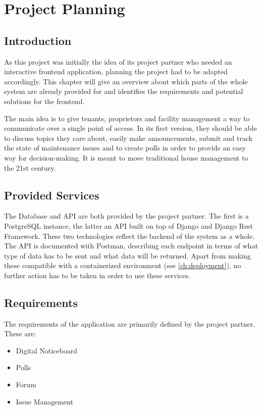 \chapter[Project Planning]{Project Planning}

\section{Introduction}
As this project was initially the idea of its project partner who needed an interactive frontend application, planning the project had to be adapted accordingly. This chapter will give an overview about which parts of the whole system are already provided for and identifies the requirements and potential solutions for the frontend.

The main idea is to give tenants, proprietors and facility management a way to communicate over a single point of access. In its first version, they should be able to discuss topics they care about, easily make announcements, submit and track the state of maintenance issues and to create polls in order to provide an easy way for decision-making. It is meant to move traditional house management to the 21st century.

\section{Provided Services}
The Database and API are both provided by the project partner. The first is a PostgreSQL instance, the latter an API built on top of Django and Django Rest Framework. These two technologies reflect the backend of the system as a whole. The API is documented with Postman, describing each endpoint in terms of what type of data has to be sent and what data will be returned. Apart from making these compatible with a containerized environment (see \autoref{ch:deployment}), no further action has to be taken in order to use these services.

\section{Requirements}
The requirements of the application are primarily defined by the project partner. These are:
\begin{itemize}
    \item Digital Noticeboard
    \item Polls
    \item Forum
    \item Issue Management    
\end{itemize}


